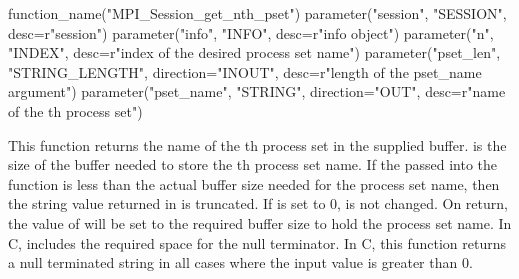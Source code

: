 \begin{mpi-binding}
    function_name("MPI_Session_get_nth_pset")
    parameter("session", "SESSION", desc=r"session")
    parameter("info", "INFO", desc=r"info object")
    parameter("n", "INDEX", desc=r"index of the desired process set name")
    parameter("pset_len", "STRING_LENGTH", direction="INOUT", desc=r"length of the pset\_name argument")
    parameter("pset_name", "STRING", direction="OUT", desc=r"name of the th process set")
\end{mpi-binding}

This function returns the name of the th process set in the supplied  buffer.
 is the size of the buffer needed to store the th process set name.  If the  passed
into the function is less than the actual buffer size needed for the process set name,
then the string value returned in  is truncated.
If  is set to 0,  is not changed.  On return, the value of  will be set
to the required buffer size to hold the process set name.  In C,  includes the required space for the null terminator.
In C, this function returns a null terminated string in all cases where the  input value is greater than 0.

